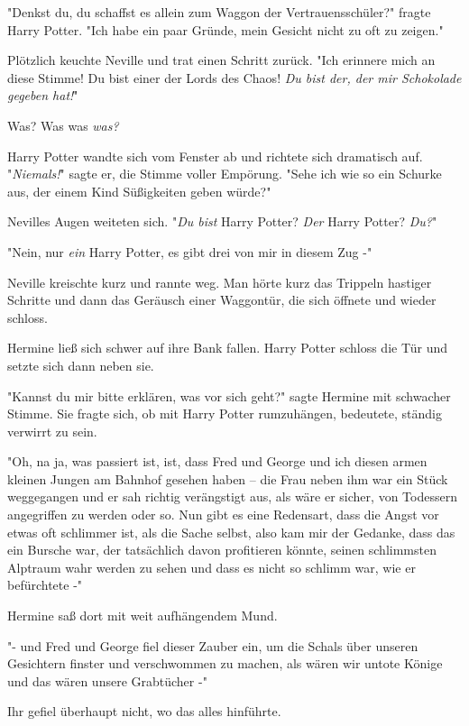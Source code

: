 {"Denkst du, du schaffst es allein zum Waggon der Vertrauensschüler?" fragte Harry Potter. "Ich habe ein paar Gründe, mein Gesicht nicht zu oft zu zeigen."

Plötzlich keuchte Neville und trat einen Schritt zurück. "Ich erinnere mich an diese Stimme! Du bist einer der Lords des Chaos! \emph{Du bist der, der mir Schokolade gegeben hat!}"

Was? Was was \emph{was?}

Harry Potter wandte sich vom Fenster ab und richtete sich dramatisch auf. "\emph{Niemals!}" sagte er, die Stimme voller Empörung. "Sehe ich wie so ein Schurke aus, der einem Kind Süßigkeiten geben würde?"

Nevilles Augen weiteten sich. "\emph{Du bist} Harry Potter? \emph{Der} Harry Potter? \emph{Du?}"

"Nein, nur \emph{ein} Harry Potter, es gibt drei von mir in diesem Zug -"

Neville kreischte kurz und rannte weg. Man hörte kurz das Trippeln hastiger Schritte und dann das Geräusch einer Waggontür, die sich öffnete und wieder schloss.

Hermine ließ sich schwer auf ihre Bank fallen. Harry Potter schloss die Tür und setzte sich dann neben sie.

"Kannst du mir bitte erklären, was vor sich geht?" sagte Hermine mit schwacher Stimme. Sie fragte sich, ob mit Harry Potter rumzuhängen, bedeutete, ständig verwirrt zu sein.

"Oh, na ja, was passiert ist, ist, dass Fred und George und ich diesen armen kleinen Jungen am Bahnhof gesehen haben -- die Frau neben ihm war ein Stück weggegangen und er sah richtig verängstigt aus, als wäre er sicher, von Todessern angegriffen zu werden oder so. Nun gibt es eine Redensart, dass die Angst vor etwas oft schlimmer ist, als die Sache selbst, also kam mir der Gedanke, dass das ein Bursche war, der tatsächlich davon profitieren könnte, seinen schlimmsten Alptraum wahr werden zu sehen und dass es nicht so schlimm war, wie er befürchtete -"

Hermine saß dort mit weit aufhängendem Mund.

"- und Fred und George fiel dieser Zauber ein, um die Schals über unseren Gesichtern finster und verschwommen zu machen, als wären wir untote Könige und das wären unsere Grabtücher -"

Ihr gefiel überhaupt nicht, wo das alles hinführte.

}
